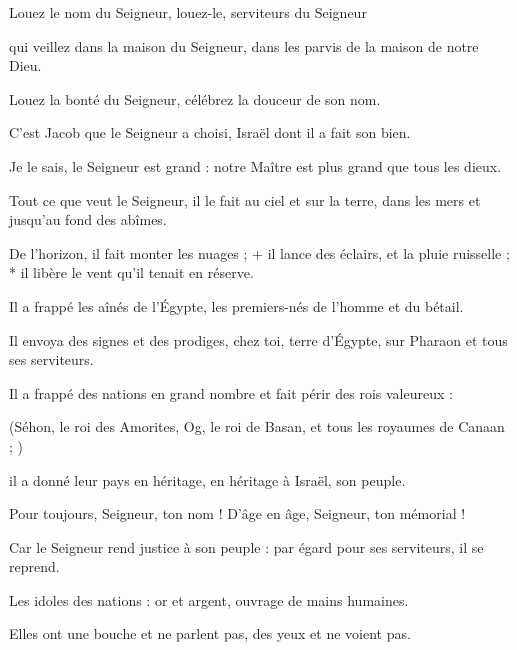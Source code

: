 \item Louez le nom du Seigneur, louez-le, serviteurs du Seigneur

\item qui veillez dans la maison du Seigneur, dans les parvis de la maison de notre Dieu.

\item Louez la bonté du Seigneur, célébrez la douceur de son nom.

\item C'est Jacob que le Seigneur a choisi, Israël dont il a fait son bien.

\item Je le sais, le Seigneur est grand : notre Maître est plus grand que tous les dieux.

\item Tout ce que veut le Seigneur, il le fait au ciel et sur la terre, dans les mers et jusqu'au fond des abîmes.

\item De l'horizon, il fait monter les nuages ; + il lance des éclairs, et la pluie ruisselle ; * il libère le vent qu'il tenait en réserve.

\item Il a frappé les aînés de l'Égypte, les premiers-nés de l'homme et du bétail.

\item Il envoya des signes et des prodiges, chez toi, terre d'Égypte, sur Pharaon et tous ses serviteurs.

\item Il a frappé des nations en grand nombre et fait périr des rois valeureux :

\item (Séhon, le roi des Amorites, Og, le roi de Basan, et tous les royaumes de Canaan ; )

\item il a donné leur pays en héritage, en héritage à Israël, son peuple.

\item Pour toujours, Seigneur, ton nom ! D'âge en âge, Seigneur, ton mémorial !

\item Car le Seigneur rend justice à son peuple : par égard pour ses serviteurs, il se reprend.

\item Les idoles des nations : or et argent, ouvrage de mains humaines.

\item Elles ont une bouche et ne parlent pas, des yeux et ne voient pas.

